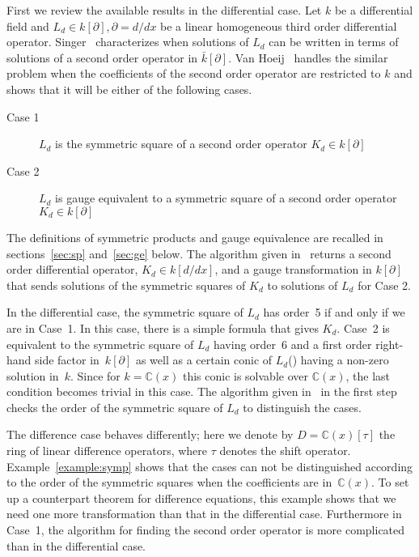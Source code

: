 \documentclass{article}
\newcommand{\C}{{\mathbb{C}}} \newcommand{\N}{{\mathbb{N}}}
\begin{document}
First we review the available results in the differential case.  Let $k$ be a differential
field and $L_d \in k[\partial],\partial=d/dx$ be a linear homogeneous third order
differential operator.  Singer~\cite{MS85} characterizes when solutions of $L_d$ can be
written in terms of solutions of a second order operator in $\bar{k}[\partial]$.  Van
Hoeij~\cite{vH07} handles the similar problem when the coefficients of the second order
operator are restricted to $k$ and shows that it will be either of the following cases.
\begin{description}
\item[Case 1] $L_d$ is the symmetric square of a second order operator $K_d \in
  k[\partial]$
\item[Case 2] $L_d$ is gauge equivalent to a symmetric square of a second order operator
  $K_d \in k[\partial]$
\end{description} 
The definitions of symmetric products and gauge equivalence are recalled in sections~\ref{sec:sp}
and~\ref{sec:ge} below.  The algorithm given in~\cite{vH07} returns a second order differential
operator, $K_d \in k[d/dx]$, and a gauge transformation in $k[\partial]$ that sends
solutions of the symmetric squares of $K_d$ to solutions of $L_d$ for Case 2.

In the differential case, the symmetric square of $L_d$ has order~5 if and only if we are
in Case~1. In this case, there is a simple formula that gives $K_d$.  Case~2 is equivalent to the
symmetric square of $L_d$ having order~6 and a first order right-hand side factor
in~$k[\partial]$ as well as a certain conic of $L_d$(\cite[Equation 4.2.1]{MS85}) having a
non-zero solution in~$k$.  Since for $k=\C(x)$ this conic is solvable over $\C(x)$, the
last condition becomes trivial in this case.  The algorithm given in~\cite{vH07} in the
first step checks the order of the symmetric square of $L_d$ to distinguish the cases.


The difference case behaves differently; here we denote by $D=\C(x)[\tau]$ the ring of
linear difference operators, where $\tau$ denotes the shift operator.
Example~\ref{example:symp} shows that the cases can not be distinguished according to the
order of the symmetric squares when the coefficients are in~$\C(x)$. 
To set up a counterpart theorem for difference equations, 
this example shows that we need one more transformation than that in the differential case. 
Furthermore in Case~1, the algorithm for
finding the second order operator is more complicated than in the differential case.
\end{document}

